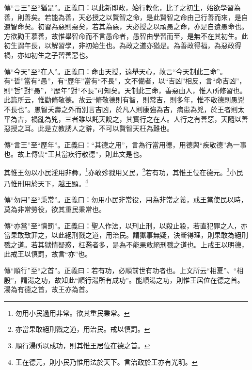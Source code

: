 {\noindent\zhuan{}\fzbyks 傳“言王”至“猶是”。正義曰：以此新即政，始行教化，比子之初生，始欲學習為善，則善矣。若能為善，天必授之以賢智之命，是此賢智之命由己行善而來，是自遺智命矣。初習為惡則惡矣，若其為惡，天必授之以頑愚之命，亦是自遺愚命也。方欲勸王慕善，故惟舉智命而不言愚命者，愚智由學習而至，是無不在其初生。此初生謂年長，以解習學，非初始生也。為政之道亦猶是。為善政得福，為惡政得禍，亦如初生之子習善惡也。 \par}

{\noindent\zhuan{}\fzbyks 傳“今天”至“在人”。正義曰：命由天授，遠舉天心，故言“今天制此三命”。有“哲”當有“愚”，有“歷年”當有“不長”，文不備者，以“吉凶”相反，言“命吉凶”，則“哲”對“愚”，“歷年”對“不長”可知矣。天制此三命，善惡由人，惟人所修習也。此篇所云，惟勸脩敬德。故云“脩敬德則有智，則常吉，則多年，惟不敬德則愚兇不長也”。愚智夭壽之外而別言吉凶，於凡人則康強為吉，病患為兇，於王者則太平為吉，禍亂為兇，三者雖以託天說之，其實行之在人。人行之有善惡，天隨以善惡授之耳。此是立教誘人之辭，不可以賢智天枉為難也。 \par}

{\noindent\zhuan{}\fzbyks 傳“言王”至“歷年”。正義曰：“其德之用”，言為行當用德，用德與“疾敬德”為一事也。故上傳雲“王其當疾行敬德”，則此文是也。 \par}

其惟王勿以小民淫用非彝，\footnote{勿用小民過用非常。欲其重民秉常。}亦敢殄戮用乂民，\footnote{亦當果敢絕刑戮之道，用治民。戒以慎罰。}若有功，其惟王位在德元。\footnote{順行湯所以成功，則其惟王居位在德之首。}小民乃惟刑用於天下，越王顯。\footnote{王在德元，則小民乃惟用法於天下。言治政於王亦有光明。}

{\noindent\zhuan{}\fzbyks 傳“勿用”至“秉常”。正義曰：勿用小民非常役，用為非常之義，戒王當使民以時，莫為非常勞役，欲其重民秉常也。 \par}

{\noindent\zhuan{}\fzbyks 傳“亦當”至“慎罰”。正義曰：聖人作法，以刑止刑，以殺止殺，若直犯罪之人，亦當果敢致罪之，以此絕刑戮之道，用治民。謂獄事無疑，決斷得理，則果敢為絕刑戮之道。若其獄情疑惑，枉濫者多，是為不能果敢絕刑戮之道也。上戒王以明德，此戒王以慎罰，故言“亦”也。 \par}

{\noindent\zhuan{}\fzbyks 傳“順行”至“之首”。正義曰：若有功，必順前世有功者也。上文所云“相夏”、“相殷”，謂湯之功，故知此“順行湯所有成功”。能順湯之功，則惟王居位在德之首。湯為有德之首，故王亦為首。 \par}

